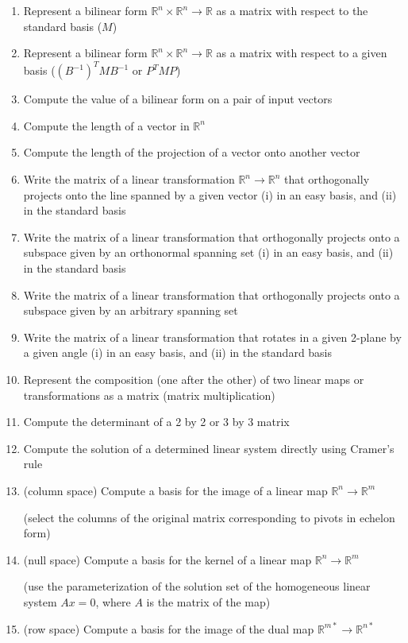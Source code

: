 \documentclass[10pt]{article}
\begin{document}
\begin{enumerate}
\item{Represent a bilinear form $\mathbb{R}^n\times\mathbb{R}^n\rightarrow\mathbb{R}$ as a matrix with respect to the standard basis ($M$)}
\item{Represent a bilinear form $\mathbb{R}^n\times\mathbb{R}^n\rightarrow\mathbb{R}$ as a matrix with respect to a given basis ($(B^{-1})^{T}MB^{-1}$ or $P^{T}MP$)}
\item{Compute the value of a bilinear form on a pair of input vectors}
\item{Compute the length of a vector in $\mathbb{R}^n$}
\item{Compute the length of the projection of a vector onto another vector}
\item{Write the matrix of a linear transformation $\mathbb{R}^n\rightarrow\mathbb{R}^n$ that orthogonally projects onto the line spanned by a given vector (i) in an easy basis, and (ii) in the standard basis}
\item{Write the matrix of a linear transformation that orthogonally projects onto a subspace given by an orthonormal spanning set (i) in an easy basis, and (ii) in the standard basis}
\item{Write the matrix of a linear transformation that orthogonally projects onto a subspace given by an arbitrary spanning set}
\item{Write the matrix of a linear transformation that rotates in a given 2-plane by a given angle (i) in an easy basis, and (ii) in the standard basis}
\item{Represent the composition (one after the other) of two linear maps or transformations as a matrix (matrix multiplication)}
\item{Compute the determinant of a 2 by 2 or 3 by 3 matrix}
\item{Compute the solution of a determined linear system directly using Cramer's rule}
\item{(column space) Compute a basis for the image of a linear map $\mathbb{R}^n\rightarrow\mathbb{R}^m$

(select the columns of the original matrix corresponding to pivots in echelon form)}
\item{(null space) Compute a basis for the kernel of a linear map $\mathbb{R}^n\rightarrow\mathbb{R}^m$

(use the parameterization of the solution set of the homogeneous linear system $Ax=0$, where $A$ is the matrix of the map)}
\item{(row space) Compute a basis for the image of the dual map $\mathbb{R}^{m*}\rightarrow\mathbb{R}^{n*}$

}
\end{enumerate}
\end{document}

